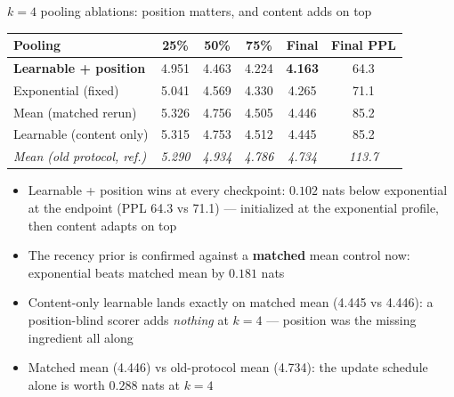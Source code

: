 \documentclass[10pt,aspectratio=169]{beamer}
\newcommand{\good}[1]{\textcolor{okgreen}{#1}}
\begin{document}
\begin{frame}{$k{=}4$ pooling ablations: position matters, and content adds on top}
  \footnotesize
  \begin{center}
  \begin{tabular}{lccccc}
    \toprule
    Pooling & 25\% & 50\% & 75\% & Final & Final PPL \\
    \midrule
    \good{\textbf{Learnable + position}} & \good{4.951} & \good{4.463} &
      \good{4.224} & \good{\textbf{4.163}} & \good{64.3} \\
    Exponential (fixed) & 5.041 & 4.569 & 4.330 & 4.265 & 71.1 \\
    Mean (matched rerun) & 5.326 & 4.756 & 4.505 & 4.446 & 85.2 \\
    Learnable (content only) & 5.315 & 4.753 & 4.512 & 4.445 & 85.2 \\
    \midrule
    \textit{Mean (old protocol, ref.)} & \textit{5.290} & \textit{4.934}
      & \textit{4.786} & \textit{4.734} & \textit{113.7} \\
    \bottomrule
  \end{tabular}
  \end{center}

  \vspace{0.4em}
  \begin{itemize}
    \item \good{Learnable + position wins at every checkpoint}: $0.102$ nats
          below exponential at the endpoint (PPL 64.3 vs 71.1) --- initialized
          at the exponential profile, then content adapts on top
    \item The recency prior is confirmed against a \textbf{matched} mean
          control now: exponential beats matched mean by $0.181$ nats
    \item Content-only learnable lands exactly on matched mean
          (4.445 vs 4.446): a position-blind scorer adds \emph{nothing} at
          $k{=}4$ --- position was the missing ingredient all along
    \item Matched mean (4.446) vs old-protocol mean (4.734): the update
          schedule alone is worth $0.288$ nats at $k{=}4$
  \end{itemize}
\end{frame}
\end{document}
